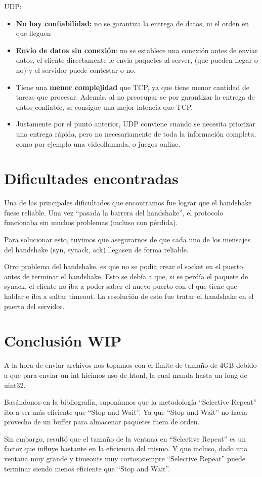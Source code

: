 \documentclass{article}
\begin{document}
UDP:

\begin{itemize}
\item
  \textbf{No hay confiabilidad:} no se garantiza la entrega de datos, ni el orden en que lleguen
\item
  \textbf{Envío de datos sin conexión}: no se establece una conexión antes de enviar datos, el cliente directamente le envia paquetes al server, (que pueden llegar o no) y el servidor puede contestar o no.
\item
  Tiene una \textbf{menor complejidad} que TCP, ya que tiene menor cantidad de tareas que procesar. Además, al no preocupar se por garantizar la entrega de datos confiable, se consigue una mejor latencia que TCP.
\item
  Justamente por el punto anterior, UDP conviene cuando se necesita priorizar una entrega rápida, pero no necesariamente de toda la información completa, como por ejemplo una videollamada, o juegos online.
\end{itemize}

\section{\texorpdfstring{\textbf{Dificultades
encontradas}}{Dificultades encontradas}}\label{dificultades-encontradas}

Una de las principales dificultades que encontramos fue lograr que el handshake fuese reliable. Una vez ``pasada la barrera del handshake'', el protocolo funcionaba sin muchos problemas (incluso con pérdida).

Para solucionar esto, tuvimos que asegurarnos de que cada uno de los mensajes del handshake (syn, synack, ack) llegasen de forma reliable.

Otro problema del handshake, es que no se podía crear el socket en el puerto antes de terminar el handshake. Esto se debía a que, si se perdía el paquete de synack, el cliente no iba a poder saber el nuevo puerto con el que tiene que hablar e iba a saltar timeout. La resolución de esto fue tratar el handshake en el puerto del servidor.

\section{\texorpdfstring{\textbf{Conclusión
WIP}}{Conclusión}}\label{conclusiuxf3n-wip}

A la hora de enviar archivos nos topamos con el límite de tamaño de 4GB debido a que para enviar un int hicimos uso de htonl, la cual manda hasta un long de uint32.



Basándonos en la bibliografía, suponíamos que la metodología ``Selective Repeat'' iba a ser más eficiente que ``Stop and Wait''. Ya que ``Stop and Wait'' no hacía provecho de un buffer para almacenar paquetes fuera de orden.

Sin embargo, resultó que el tamaño de la ventana en ``Selective Repeat'' es un factor que influye bastante en la eficiencia del mismo. Y que incluso, dado una ventana muy grande y timeouts muy cortos;siempre ``Selective Repeat'' puede terminar siendo menos eficiente que ``Stop and Wait''.
\end{document}
